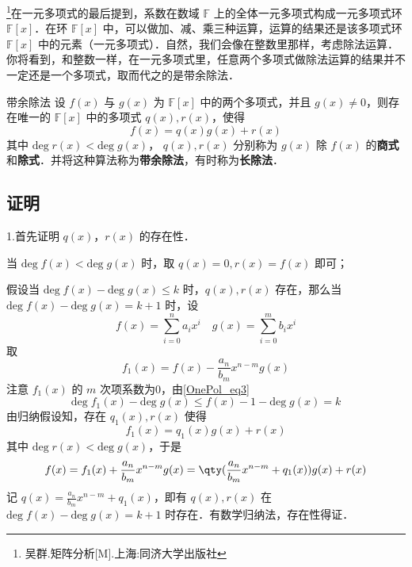 
\footnote{吴群.矩阵分析[M].上海:同济大学出版社}在一元多项式的最后提到，系数在数域 $\mathbb{F}$ 上的全体一元多项式构成一元多项式环 $\mathbb{F}[x]$．在环 $\mathbb{F}[x]$ 中，可以做加、减、乘三种运算，运算的结果还是该多项式环 $\mathbb{F}[x]$ 中的元素（一元多项式）．自然，我们会像在整数里那样，考虑除法运算．你将看到，和整数一样，在一元多项式里，任意两个多项式做除法运算的结果并不一定还是一个多项式，取而代之的是带余除法．
\begin{theorem}{带余除法}\label{DivAlg_the1}
设 $f(x)$ 与 $g(x)$ 为 $\mathbb{F}[x]$ 中的两个多项式，并且 $g(x)\neq 0$，则存在唯一的 $\mathbb{F}[x]$ 中的多项式 $q(x),r(x)$，使得
\begin{equation}
f(x)=q(x)g(x)+r(x)
\end{equation}
其中 $\mathrm{deg}\;r(x)<\mathrm{deg}\;g(x)$， $q(x),r(x)$ 分别称为 $g(x)$ 除 $f(x)$ 的\textbf{商式}和\textbf{除式}．并将这种算法称为\textbf{带余除法}，有时称为\textbf{长除法}．
\end{theorem}
\subsection{证明}
1.首先证明 $q(x)$，$r(x)$ 的存在性．

当 $\mathrm{deg}\;f(x)<\mathrm{deg}\;g(x)$ 时，取 $q(x)=0,r(x)=f(x)$ 即可；

假设当 $\mathrm{deg}\;f(x)-\mathrm{deg}\;g(x)\leq k$ 时，$q(x),r(x)$ 存在，那么当 $\mathrm{deg}\;f(x)-\mathrm{deg}\;g(x)=k+1$ 时，设
\begin{equation}
f(x)=\sum_{i=0}^n a_i x^i\quad g(x)=\sum_{i=0}^m b_ix^i
\end{equation}
取
\begin{equation}
f_1(x)=f(x)-\frac{a_n}{b_m}x^{n-m}g(x)
\end{equation}
注意 $f_1(x)$ 的 $m$ 次项系数为0，由\autoref{OnePol_eq3}~
\begin{equation}
\mathrm{deg}\;f_1(x)-\mathrm{deg}\;g(x)\leq f(x)-1-\mathrm{deg}\;g(x)=k
\end{equation}
由归纳假设知，存在 $q_1(x),r(x)$ 使得
\begin{equation}
f_1(x)=q_1(x)g(x)+r(x)
\end{equation}
其中 $\mathrm{deg}\;r(x)<\mathrm{deg}\;g(x)$，于是
\begin{equation}
f(x)=f_1(x)+\frac{a_n}{b_m}x^{n-m}g(x)=\qty(\frac{a_n}{b_m}x^{n-m}+q_1(x))g(x)+r(x)
\end{equation}
记 $q(x)=\frac{a_n}{b_m}x^{n-m}+q_1(x)$，即有 $q(x),r(x)$ 在 $\mathrm{deg}\;f(x)-\mathrm{deg}\;g(x)=k+1$ 时存在．有数学归纳法，存在性得证．

